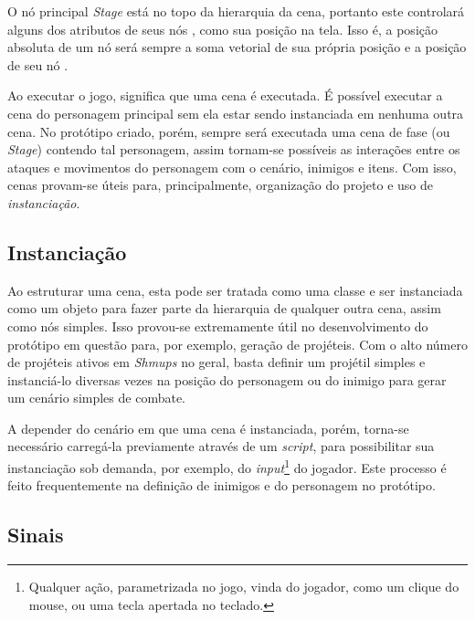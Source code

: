 O nó principal \textit{Stage} está no topo da hierarquia da cena, portanto este controlará alguns dos atributos de seus nós \textquotedbl{}, como sua posição na tela. Isso é, a posição absoluta de um nó será sempre a soma vetorial de sua própria posição e a posição de seu nó \textquotedbl{}.

Ao executar o jogo, significa que uma cena é executada. É possível executar a cena do personagem principal sem ela estar sendo instanciada em nenhuma outra cena. No protótipo criado, porém, sempre será executada uma cena de fase (ou \textit{Stage}) contendo tal personagem, assim tornam-se possíveis as interações entre os ataques e movimentos do personagem com o cenário, inimigos e itens. Com isso, cenas provam-se úteis para, principalmente, organização do projeto e uso de \textit{instanciação}.

\subsection{Instanciação}

Ao estruturar uma cena, esta pode ser tratada como uma classe e ser instanciada como um objeto para fazer parte da hierarquia de qualquer outra cena, assim como nós simples. Isso provou-se extremamente útil no desenvolvimento do protótipo em questão para, por exemplo, geração de projéteis. Com o alto número de projéteis ativos em \textit{Shmups} no geral, basta definir um projétil simples e instanciá-lo diversas vezes na posição do personagem ou do inimigo para gerar um cenário simples de combate.

A depender do cenário em que uma cena é instanciada, porém, torna-se necessário carregá-la previamente através de um \textit{script}, para possibilitar sua instanciação sob demanda, por exemplo, do \textit{input}\footnote{
    Qualquer ação, parametrizada no jogo, vinda do jogador, como um clique do mouse, ou uma tecla apertada no teclado.
} do jogador. Este processo é feito frequentemente na definição de inimigos e do personagem no protótipo.

\subsection{Sinais}

